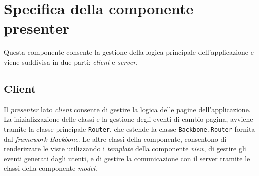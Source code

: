 \section{Specifica della componente presenter}
Questa componente consente la gestione della logica principale dell'applicazione \progetto{} e viene suddivisa in due parti: \textit{client} e \textit{server}.

\subsection{Client}

Il \textit{presenter} lato \textit{client} consente di gestire la logica delle pagine dell'applicazione.
La inizializzazione delle classi e la gestione degli eventi di cambio pagina, avviene tramite la classe principale \texttt{Router}, che estende la classe \texttt{Backbone.Router} fornita dal \textit{framework Backbone}.
Le altre classi della componente, consentono di renderizzare le viste utilizzando i \textit{template} della componente \textit{view}, di gestire gli eventi generati dagli utenti, e di gestire la comunicazione con il server tramite le classi della componente \textit{model}.

